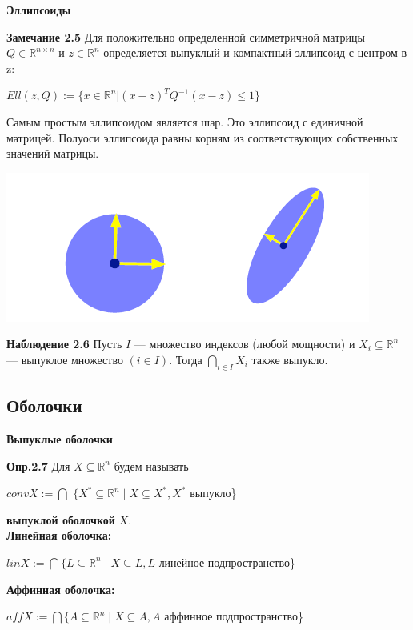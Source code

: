 {\bf Эллипсоиды}

{\bf Замечание 2.5} Для положительно определенной симметричной матрицы $Q\in\mathbb{R}^{n\times n}$ и $z\in\mathbb{R}^n$  определяется выпуклый и компактный эллипсоид с центром в z: \\
\begin{center}
$Ell(z,Q):=\{x\in\mathbb{R}^n|(x-z)^T Q^{-1} (x-z)\leq 1\}$
\end{center}

Самым простым эллипсоидом является шар. Это эллипсоид с единичной матрицей. Полуоси эллипсоида равны корням из соответствующих собственных значений матрицы.
\begin{center}
\includegraphics[scale=0.8]{image4.png}
\end{center}
{\bf Наблюдение 2.6}
Пусть $I$ --- множество индексов (любой мощности) и $X_i \subseteq \mathbb{R}^n$ --- выпуклое множество $(i \in I)$. Тогда $\bigcap_{i \in I}X_i$ также выпукло.\\

\subsection{Оболочки}
{\bf Выпуклые оболочки}

{\bf Опр.2.7}
Для $X \subseteq \mathbb{R}^n$ будем называть
\begin{center}
$conv X:=\bigcap$ $\{X^* \subseteq \mathbb{R}^n \mid X \subseteq X^*, X^* $ выпукло\}
\end{center}
{\bf выпуклой оболочкой} $X$.\\

{\bf Линейная оболочка:}
\begin{center}
$lin X:=\bigcap \{L \subseteq \mathbb{R}^n \mid X \subseteq L, L $ линейное подпространство\}
\end{center}

{\bf Аффинная оболочка:}
\begin{center}
$aff X:=\bigcap \{A \subseteq \mathbb{R}^n \mid X \subseteq A, A $ аффинное подпространство\}
\end{center}

